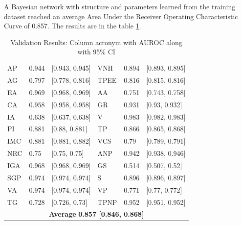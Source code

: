A Bayesian network with structure and parameters learned from the training dataset reached an average Area Under the Receiver Operating Characteristic Curve of 0.857. The results are in the table \ref{tab:result_auc}.



\begin{table}[htpb]
 \caption{Validation Results: Column acronym with AUROC along with 95\% CI} \label{tab:result_auc} 

\renewcommand{\arraystretch}{1.2}
\centering
\begin{tabular} { p{1.5cm} p{1.5cm} p{3cm} p{1.5cm} p{1.5cm} l }
\hline
AP & 0.944 & [0.943, 0.945] & VNH & 0.894 & [0.893, 0.895] \\
AG & 0.797 & [0.778, 0.816] & TPEE & 0.816 & [0.815, 0.816] \\
EA & 0.969 & [0.968, 0.969] & AA & 0.751 & [0.743, 0.758] \\
CA & 0.958 & [0.958, 0.958] & GR & 0.931 & [0.93, 0.932] \\
IA & 0.638 & [0.637, 0.638] & V & 0.983 & [0.982, 0.983] \\
PI & 0.881 & [0.88, 0.881] & TP & 0.866 & [0.865, 0.868] \\
IMC & 0.881 & [0.881, 0.882] & VCS & 0.79 & [0.789, 0.791] \\
NRC & 0.75 & [0.75, 0.75] & ANP & 0.942 & [0.938, 0.946] \\
IGA & 0.968 & [0.968, 0.969] & GS & 0.514 & [0.507, 0.52] \\
SGP & 0.974 & [0.974, 0.974] & S & 0.896 & [0.896, 0.897] \\
VA & 0.974 & [0.974, 0.974] & VP & 0.771 & [0.77, 0.772] \\
TG & 0.728 & [0.726, 0.73] & TPNP & 0.952 & [0.951, 0.952] \\
\hline
 \multicolumn{6}{c}{\textbf{Average}  \textbf{0.857 [0.846, 0.868]}} \\

\hline
\end{tabular}
\end{table}


